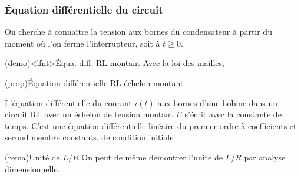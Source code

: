 \documentclass[../../main/main.tex]{subfiles}
\begin{document}
\subsubsection{Équation différentielle du circuit}
On cherche à connaître la tension aux bornes du condensateur à partir du moment
où l’on ferme l’interrupteur, soit à $t \geq 0$.
\begin{tcb}[label=demo:eqdiffrl](demo)<lfnt>{Équa. diff. RL montant}
	Avec la loi des mailles,
	\vspace{-15pt}
\end{tcb}
\begin{tcb}[label=prop:eqdifflc, sidebyside, righthand ratio=.4](prop){Équation
			différentielle RL échelon montant}

	L'équation différentielle du courant $i(t)$ aux bornes d'une bobine
	dans un circuit RL avec un échelon de tension montant $E$ s'écrit
	\psw{
		\[
			\boxed{\dv{i}{t} + \frac{1}{\tau}i = \frac{1}{\tau}\frac{E}{R}}
		\]
	}
	avec  la constante de temps.
	\tcblower
	C'est une équation différentielle linéaire du premier ordre à
	coefficients et second membre constants, de condition initiale
	\psw{
		\[
			\boxed{i(0^-) = i(0^+) = 0}
		\]
	}
\end{tcb}

\begin{tcb}(rema){Unité de $L/R$}
	On peut de même démontrer l'unité de $L/R$ par analyse dimensionnelle.
\end{tcb}
\end{document}
